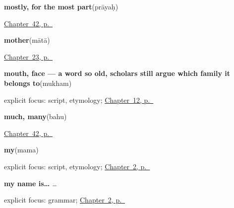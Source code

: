 \noindent\begin{minipage}[t]{\linewidth}
\raggedright
\textbf{mostly, for the most part}\enspace\emph{}\enspace(prāyaḥ)\par
\footnotesize \hyperref[ch:sa-replies-third]{Chapter~42, p.~\pageref*{ch:sa-replies-third}}
\end{minipage}\par\smallskip

\noindent\begin{minipage}[t]{\linewidth}
\raggedright
\textbf{mother}\enspace\emph{}\enspace(mātā)\par
\footnotesize \hyperref[ch:sa-kinship]{Chapter~23, p.~\pageref*{ch:sa-kinship}}
\end{minipage}\par\smallskip

\noindent\begin{minipage}[t]{\linewidth}
\raggedright
\textbf{mouth, face — a word so old, scholars still argue which family it belongs to}\enspace\emph{}\enspace(mukham)\par
\footnotesize explicit focus: script, etymology; \hyperref[ch:sa-face-nouns-1]{Chapter~12, p.~\pageref*{ch:sa-face-nouns-1}}
\end{minipage}\par\smallskip

\noindent\begin{minipage}[t]{\linewidth}
\raggedright
\textbf{much, many}\enspace\emph{}\enspace(bahu)\par
\footnotesize \hyperref[ch:sa-replies-third]{Chapter~42, p.~\pageref*{ch:sa-replies-third}}
\end{minipage}\par\smallskip

\noindent\begin{minipage}[t]{\linewidth}
\raggedright
\textbf{my}\enspace\emph{}\enspace(mama)\par
\footnotesize explicit focus: script, etymology; \hyperref[ch:introductions]{Chapter~2, p.~\pageref*{ch:introductions}}
\end{minipage}\par\smallskip

\noindent\begin{minipage}[t]{\linewidth}
\raggedright
\textbf{my name is…}\enspace\emph{  … }\par
\footnotesize explicit focus: grammar; \hyperref[ch:introductions]{Chapter~2, p.~\pageref*{ch:introductions}}
\end{minipage}\par\smallskip

